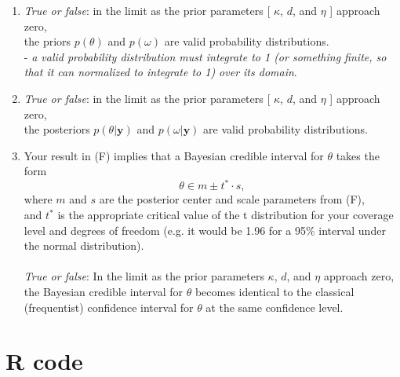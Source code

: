 \documentclass{homework}
\begin{document}
\begin{enumerate}[label=(\Alph*)]
\item \textit{True or false}: in the limit as the prior parameters [ $\kappa$, $d$, and $\eta$ ] approach zero, \\the priors $p(\theta)$ and $p(\omega)$ are valid probability distributions.
\\  - \textit{a valid probability distribution must integrate to 1 (or something finite, so that it can normalized to integrate to 1) over its domain}.

\item \textit{True or false}: in the limit as the prior parameters [ $\kappa$, $d$, and $\eta$ ] approach zero, \\the posteriors $p(\theta | \textbf{y})$ and $p(\omega | \textbf{y})$ are valid probability distributions.
\item Your result in (F) implies that a Bayesian credible interval for $\theta$ takes the form 
$$ \theta \in m \pm t^* \cdot s ,$$ where $m$ and $s$ are the posterior center and scale parameters from (F), \\and $t^*$ is the appropriate critical value of the t distribution for your coverage level and degrees of freedom (e.g. it would be 1.96 for a 95\% interval under the normal distribution).\\ \\
\textit{True or false}: In the limit as the prior parameters $\kappa$, $d$, and $\eta$ approach zero, \\the Bayesian credible interval for $\theta$ becomes identical to the classical (frequentist) confidence interval for $\theta$ at the same confidence level.

\end{enumerate}
\clearpage

\appendix
\chapter{R code}
\label{chap:code}
\end{document}
